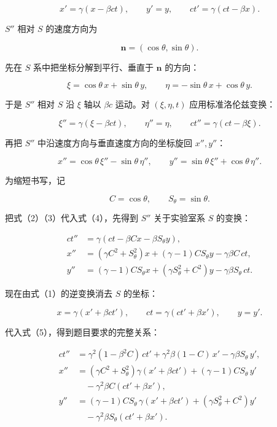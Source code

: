 \documentclass[12pt,a4paper,UTF8]{ctexart}
\begin{document}
\[
x'=\gamma(x-\beta ct),\qquad y'=y,\qquad
ct'=\gamma(ct-\beta x). \tag{1}
\]

\(S''\) 相对 \(S\) 的速度方向为

\[
\bm n=(\cos\theta,\sin\theta).
\]

先在 \(S\) 系中把坐标分解到平行、垂直于 \(\bm n\) 的方向：

\[
\xi=\cos\theta\,x+\sin\theta\,y,\qquad
\eta=-\sin\theta\,x+\cos\theta\,y. \tag{2}
\]

于是 \(S''\) 相对 \(S\) 沿 \(\xi\) 轴以 \(\beta c\) 运动。对
\((\xi,\eta,t)\) 应用标准洛伦兹变换：

\[
\xi''=\gamma(\xi-\beta ct),\qquad
\eta''=\eta,\qquad
ct''=\gamma(ct-\beta\xi). \tag{3}
\]

再把 \(S''\) 中沿速度方向与垂直速度方向的坐标旋回 \(x'',y''\)：

\[
x''=\cos\theta\,\xi''-\sin\theta\,\eta'',\qquad
y''=\sin\theta\,\xi''+\cos\theta\,\eta''. \tag{4}
\]

为缩短书写，记

\[
C=\cos\theta,\qquad S_\theta=\sin\theta.
\]

把式（2）（3）代入式（4），先得到 \(S''\) 关于实验室系 \(S\) 的变换：

\[
\begin{aligned}
ct''&=\gamma\left(ct-\beta Cx-\beta S_\theta y\right),\\
x''&=(\gamma C^2+S_\theta^2)x
+(\gamma-1)CS_\theta y-\gamma\beta C\,ct,\\
y''&=(\gamma-1)CS_\theta x
+(\gamma S_\theta^2+C^2)y-\gamma\beta S_\theta\,ct.
\end{aligned}
\tag{5}
\]

现在由式（1）的逆变换消去 \(S\) 的坐标：

\[
x=\gamma(x'+\beta ct'),\qquad
ct=\gamma(ct'+\beta x'),\qquad
y=y'. \tag{6}
\]

代入式（5），得到题目要求的完整关系：

\[
\begin{aligned}
ct''
&=\gamma^2(1-\beta^2C)\,ct'
+\gamma^2\beta(1-C)\,x'
-\gamma\beta S_\theta\,y',\\[3pt]
x''
&=(\gamma C^2+S_\theta^2)\gamma(x'+\beta ct')
+(\gamma-1)CS_\theta\,y'\\
&\quad-\gamma^2\beta C(ct'+\beta x'),\\[3pt]
y''
&=(\gamma-1)CS_\theta\,\gamma(x'+\beta ct')
+(\gamma S_\theta^2+C^2)y'\\
&\quad-\gamma^2\beta S_\theta(ct'+\beta x').
\end{aligned}
\tag{7}
\]
\end{document}
